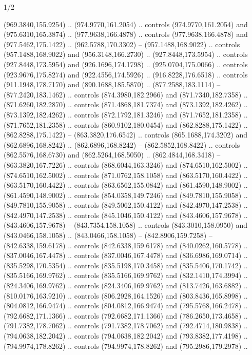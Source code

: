 \begin{flagdescription}{1/2}
\begin{scope}[xshift=0.75\flaglength,yshift=0.5\flagwidth,scale=0.00293\flagwidth]
\begin{scope}[scale=0.675,y=0.80pt, x=0.80pt,yscale=-1,xshift=-720,yshift=-240]
\begin{scope}[miter limit=4.80]
\begin{scope}[miter limit=3.00]
  (969.3840,155.9254) .. (974.9770,161.2054) .. controls (974.9770,161.2054) and
  (975.6310,165.3874) .. (977.9638,166.4878) .. controls (977.9638,166.4878) and
  (977.5462,175.1422) .. (962.5788,170.3302) -- (957.1488,168.9022) .. controls
  (957.1488,168.9022) and (956.3148,166.2730) .. (927.8448,173.5954) .. controls
  (927.8448,173.5954) and (926.1696,174.1798) .. (925.0704,175.0066) .. controls
  (923.9676,175.8274) and (922.4556,174.5926) .. (916.8228,176.6518) .. controls
  (911.1948,178.7170) and (890.1688,185.5870) .. (877.2588,183.1114) --
  (877.2420,183.1462) .. controls (874.3980,182.2966) and (871.7340,182.7358) ..
  (871.6260,182.2870) .. controls (871.4868,181.7374) and (873.1392,182.4262) ..
  (873.1392,182.4262) .. controls (872.1792,181.3246) and (871.7652,181.2358) ..
  (871.7652,181.2358) .. controls (860.9102,180.0454) and (862.8288,175.1422) ..
  (862.8288,175.1422) -- (863.3820,176.6542) .. controls (865.1688,174.3202) and
  (862.6896,168.8242) .. (862.6896,168.8242) -- (862.5852,168.8422) .. controls
  (862.5576,168.6730) and (862.5264,168.5050) .. (862.4844,168.3418) --
  (863.3820,167.7226) .. controls (868.6044,163.3246) and (874.6510,162.5002) ..
  (874.6510,162.5002) .. controls (871.0762,158.1058) and (863.5170,160.4422) ..
  (863.5170,160.4422) .. controls (863.6562,155.0842) and (861.4590,148.9002) ..
  (861.4590,148.9002) .. controls (854.0358,149.7246) and (849.7810,155.9058) ..
  (849.7810,155.9058) .. controls (849.5062,150.4122) and (842.4970,147.2538) ..
  (842.4970,147.2538) .. controls (845.1046,150.4122) and (843.4606,157.9678) ..
  (843.4606,157.9678) -- (843.7354,158.1058) .. controls (843.3010,158.0950) and
  (843.0466,158.1058) .. (843.0466,158.1058) -- (842.8906,159.7258) --
  (842.6338,159.6178) .. controls (842.6338,159.6178) and (840.0262,160.5778) ..
  (837.0046,167.4478) .. controls (837.0046,167.4478) and (836.6986,169.0714) ..
  (835.5298,170.5354) .. controls (835.5198,170.3458) and (835.5406,170.1742) ..
  (835.5166,169.9762) .. controls (835.5166,169.9762) and (832.1410,174.3994) ..
  (824.3406,169.9762) .. controls (824.3406,169.9762) and (813.7426,163.6882) ..
  (810.0176,163.9210) .. controls (806.2928,164.1526) and (803.8436,165.8998) ..
  (804.0812,166.9474) .. controls (804.0812,166.9474) and (795.5768,166.2478) ..
  (792.6682,171.1366) .. controls (792.6682,171.1366) and (786.2650,173.4658) ..
  (791.7382,178.7062) .. controls (791.7382,178.7062) and (792.4714,180.9838) ..
  (794.0638,182.2042) .. controls (794.0638,182.2042) and (793.8382,177.4198) ..
  (794.9974,178.8262) .. controls (794.9974,178.8262) and (795.2986,179.2978) ..

\end{scope}
\end{scope}
\end{scope}
\end{scope}
\end{flagdescription}
